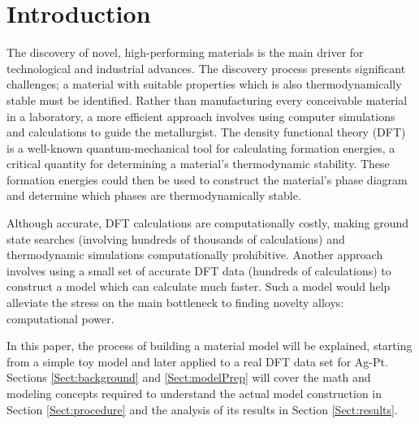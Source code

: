 \chapter{Introduction}\label{Sect:intro}
\par The discovery of novel, high-performing materials is the main driver for technological and industrial advances. The discovery process presents significant challenges; a material with suitable properties which is also thermodynamically stable must be identified. Rather than manufacturing every conceivable material in a laboratory, a more efficient approach involves using computer simulations and calculations to guide the metallurgist.  The density functional theory (DFT) is a well-known quantum-mechanical tool for calculating formation energies, a critical quantity for determining a material's thermodynamic stability.  These formation energies could then be used to construct the material's phase diagram and determine which phases are thermodynamically stable. 
\par Although accurate, DFT calculations are computationally costly, making ground state searches (involving hundreds of thousands of calculations) and thermodynamic simulations computationally prohibitive. Another approach involves using a small set of accurate DFT data (hundreds of calculations) to construct a model which can calculate much faster.  Such a model would help alleviate the stress on the main bottleneck to finding novelty alloys: computational power. 
\par In this paper, the process of building a material model will be explained, starting from a simple toy model and later applied to a real DFT data set for Ag-Pt.  Sections \ref{Sect:background} and \ref{Sect:modelPrep} will cover the math and modeling concepts required to understand the actual model construction in Section \ref{Sect:procedure} and the analysis of its results in Section \ref{Sect:results}. 